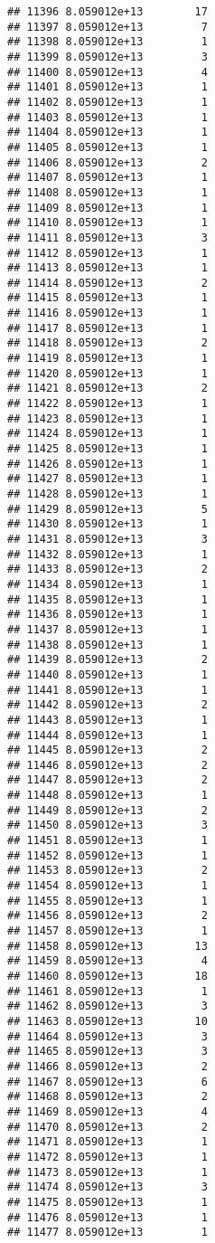 \documentclass[
]{article}
\begin{document}
\begin{verbatim}
## 11396 8.059012e+13        17
## 11397 8.059012e+13         7
## 11398 8.059012e+13         1
## 11399 8.059012e+13         3
## 11400 8.059012e+13         4
## 11401 8.059012e+13         1
## 11402 8.059012e+13         1
## 11403 8.059012e+13         1
## 11404 8.059012e+13         1
## 11405 8.059012e+13         1
## 11406 8.059012e+13         2
## 11407 8.059012e+13         1
## 11408 8.059012e+13         1
## 11409 8.059012e+13         1
## 11410 8.059012e+13         1
## 11411 8.059012e+13         3
## 11412 8.059012e+13         1
## 11413 8.059012e+13         1
## 11414 8.059012e+13         2
## 11415 8.059012e+13         1
## 11416 8.059012e+13         1
## 11417 8.059012e+13         1
## 11418 8.059012e+13         2
## 11419 8.059012e+13         1
## 11420 8.059012e+13         1
## 11421 8.059012e+13         2
## 11422 8.059012e+13         1
## 11423 8.059012e+13         1
## 11424 8.059012e+13         1
## 11425 8.059012e+13         1
## 11426 8.059012e+13         1
## 11427 8.059012e+13         1
## 11428 8.059012e+13         1
## 11429 8.059012e+13         5
## 11430 8.059012e+13         1
## 11431 8.059012e+13         3
## 11432 8.059012e+13         1
## 11433 8.059012e+13         2
## 11434 8.059012e+13         1
## 11435 8.059012e+13         1
## 11436 8.059012e+13         1
## 11437 8.059012e+13         1
## 11438 8.059012e+13         1
## 11439 8.059012e+13         2
## 11440 8.059012e+13         1
## 11441 8.059012e+13         1
## 11442 8.059012e+13         2
## 11443 8.059012e+13         1
## 11444 8.059012e+13         1
## 11445 8.059012e+13         2
## 11446 8.059012e+13         2
## 11447 8.059012e+13         2
## 11448 8.059012e+13         1
## 11449 8.059012e+13         2
## 11450 8.059012e+13         3
## 11451 8.059012e+13         1
## 11452 8.059012e+13         1
## 11453 8.059012e+13         2
## 11454 8.059012e+13         1
## 11455 8.059012e+13         1
## 11456 8.059012e+13         2
## 11457 8.059012e+13         1
## 11458 8.059012e+13        13
## 11459 8.059012e+13         4
## 11460 8.059012e+13        18
## 11461 8.059012e+13         1
## 11462 8.059012e+13         3
## 11463 8.059012e+13        10
## 11464 8.059012e+13         3
## 11465 8.059012e+13         3
## 11466 8.059012e+13         2
## 11467 8.059012e+13         6
## 11468 8.059012e+13         2
## 11469 8.059012e+13         4
## 11470 8.059012e+13         2
## 11471 8.059012e+13         1
## 11472 8.059012e+13         1
## 11473 8.059012e+13         1
## 11474 8.059012e+13         3
## 11475 8.059012e+13         1
## 11476 8.059012e+13         1
## 11477 8.059012e+13         1

\end{verbatim}
\end{document}
